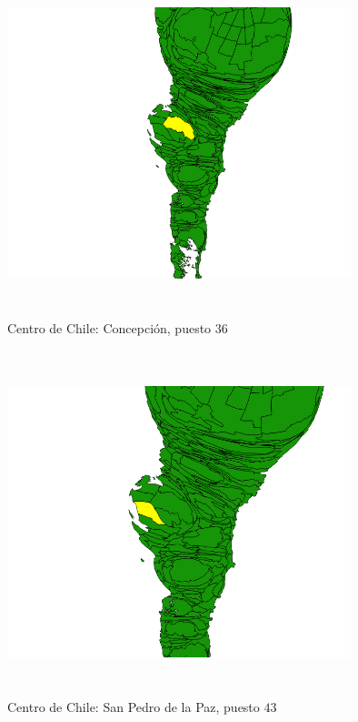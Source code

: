 \documentclass[20pt]{report}
\begin{document}
\begin{itemize}
\begin{figure}[H]
\begin{center}
\includegraphics[width=10cm, height=10cm]{concepcion42.png}
\vspace{-0.5cm} %
\caption{Centro de Chile: Concepci\'on, puesto $36$}
\label{Label para referencia}
\end{center}
\end{figure}





\begin{figure}[H]
\begin{center}
\includegraphics[width=10cm, height=10cm]{sanpedro.png}
\vspace{-0.5cm} %
\caption{Centro de Chile: San Pedro de la Paz, puesto $43$}
\label{Label para referencia}
\end{center}
\end{figure}


\end{itemize}
\end{document}
